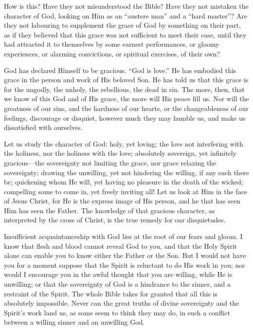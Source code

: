 \documentclass[
]{book}
\begin{document}
How is this? Have they not misunderstood the Bible? Have they not mistaken the character of God, looking on Him as an ``austere man'' and a ``hard master''? Are they not labouring to supplement the grace of God by something on their part, as if they believed that this grace was not sufficient to meet their case, until they had attracted it to themselves by some earnest performances, or gloomy experiences, or alarming convictions, or spiritual exercises, of their own?

God has declared Himself to be gracious. ``God is love.'' He has embodied this grace in the person and work of His beloved Son. He has told us that this grace is for the ungodly, the unholy, the rebellious, the dead in sin. The more, then, that we know of this God and of His grace, the more will His peace fill us. Nor will the greatness of our sins, and the hardness of our hearts, or the changeableness of our feelings, discourage or disquiet, however much they may humble us, and make us dissatisfied with ourselves.

Let us study the character of God: holy, yet loving; the love not interfering with the holiness, nor the holiness with the love; absolutely sovereign, yet infinitely gracious---the sovereignty not limiting the grace, nor grace relaxing the sovereignty; drawing the unwilling, yet not hindering the willing, if any such there be; quickening whom He will, yet having no pleasure in the death of the wicked; compelling some to come in, yet freely inviting all! Let us look at Him in the face of Jesus Christ, for He is the express image of His person, and he that has seen Him has seen the Father. The knowledge of that gracious character, as interpreted by the cross of Christ, is the true remedy for our disquietudes.

Insufficient acquaintanceship with God lies at the root of our fears and gloom. I know that flesh and blood cannot reveal God to you, and that the Holy Spirit alone can enable you to know either the Father or the Son. But I would not have you for a moment suppose that the Spirit is reluctant to do His work in you; nor would I encourage you in the awful thought that you are willing, while He is unwilling; or that the sovereignty of God is a hindrance to the sinner, and a restraint of the Spirit. The whole Bible takes for granted that all this is absolutely impossible. Never can the great truths of divine sovereignty and the Spirit's work land us, as some seem to think they may do, in such a conflict between a willing sinner and an unwilling God.
\end{document}
